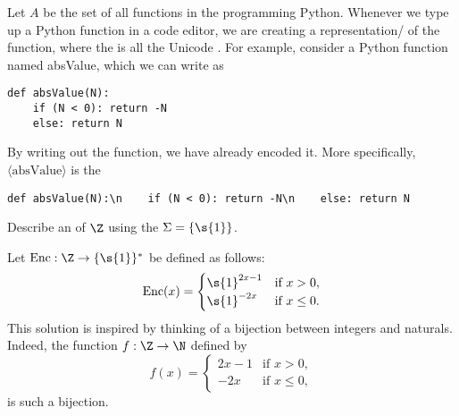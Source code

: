 \begin{flex}
\begin{example} \label{example:Encoding-of-Python-functions}
Let $A$ be the set of all functions in the programming  Python. Whenever we type up a Python function in a code editor, we are creating a  representation/ of the function, where the  is all the Unicode . For example, consider a Python function named absValue, which we can write as
\begin{verbatim}
def absValue(N):
    if (N < 0): return -N
    else: return N
\end{verbatim}
By writing out the function, we have already encoded it. More specifically, $\langle \text{absValue} \rangle$ is the 
\begin{verbatim}
def absValue(N):\n    if (N < 0): return -N\n    else: return N
\end{verbatim}
\end{example}
\end{flex}


\begin{flex}
\begin{exercise} \label{exercise:Unary-encoding-of-integers}
Describe an  of $\Z$ using the  $\Sigma = \{\s{1}\}$.
\end{exercise}

\begin{solution}
Let $\text{Enc}:\Z \to \{\s{1}\}^*$ be defined as follows:
\[
\text{Enc}(x) = 
\begin{cases}
\s{1}^{2x-1} & \text{if $x > 0$}, \\
\s{1}^{-2x}  & \text{if $x \leq 0$.}
\end{cases}
\]
This solution is inspired by thinking of a bijection between integers and naturals. Indeed, the function $f: \Z \to \N$ defined by  
\[
f(x) = 
\begin{cases}
2x-1 & \text{if $x > 0$}, \\
-2x  & \text{if $x \leq 0$,}
\end{cases}
\]
is such a bijection.
\end{solution}
\end{flex}



